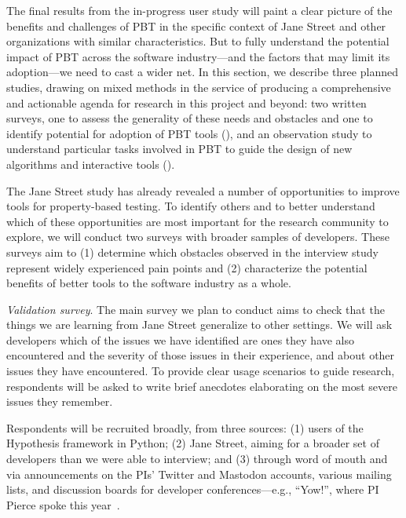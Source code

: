 

The final results from the in-progress user study will paint a clear
picture of the benefits and challenges of PBT in the specific context
of Jane Street and other organizations with similar characteristics.  But to
fully understand the potential impact of PBT across the software
industry---and the factors that may limit its adoption---we need to
cast a wider net.
%
In this section, we describe three planned studies, drawing on mixed
methods in the service of producing a comprehensive and actionable
agenda for research in this project and beyond: two
written surveys, one to assess the generality of these needs and obstacles
and one to identify potential for adoption of PBT tools
(), and an observation study to understand
particular tasks involved in PBT to guide the design of new algorithms
and interactive tools ().

%
The Jane Street study has already revealed a number of
opportunities to improve tools for property-based testing. To identify
others and to better understand which of these opportunities are most
important for the research community to explore, we will conduct two
surveys with broader samples of developers. These surveys aim to
(1) determine which obstacles observed in the interview study
represent widely experienced pain points and
(2) characterize the potential benefits of better tools to the
software industry as a whole.

\emph{Validation survey}. The main survey we plan to conduct aims to check that
the things we are learning from Jane Street generalize to other settings.
We will
ask developers which of the issues we have identified are
ones they have also encountered and the severity of those issues
in their experience, and about
other issues they have encountered.
To provide
clear usage scenarios to guide research, respondents will
be asked to write brief anecdotes elaborating on the
most severe issues they remember.

Respondents will
be recruited broadly, from three sources: (1)
users of the Hypothesis framework in Python; (2) Jane Street, aiming for
a broader set of developers than we were able to interview; and (3)
through word of mouth and via announcements on the PIs' Twitter and Mastodon
accounts, various mailing lists, and discussion boards for developer
conferences---e.g., ``Yow!'', where PI Pierce spoke this
year~\cite{Pierce:Yow22}.

